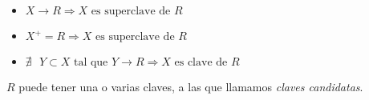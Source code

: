 \documentclass[preview]{standalone}
\begin{document}
\begin{itemize}
\item $X\rightarrow R \Longrightarrow X \text{ es superclave de } R$
\item $X^+ = R \Longrightarrow X \text{ es superclave de } R$
\item $\nexists \text{ } Y \subset X \text{ tal que } Y\rightarrow R \Longrightarrow X \text{ es clave de } R$
\end{itemize}
$R$ puede tener una o varias claves, a las que llamamos \textit{claves candidatas}.
\end{document}
